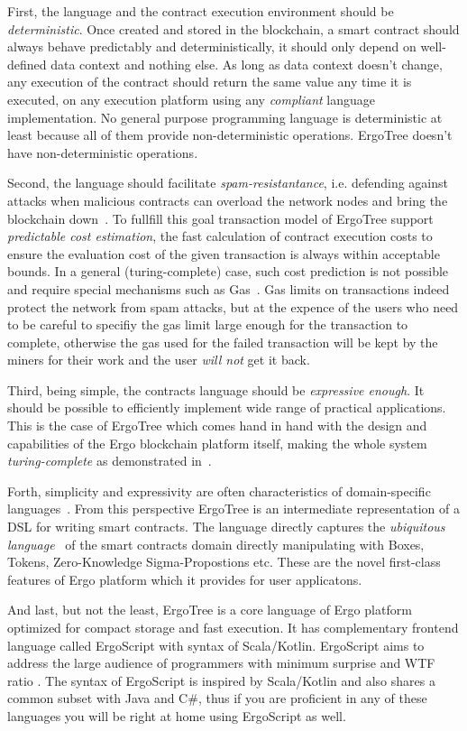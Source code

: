 \documentclass[11pt]{article}
\newcommand{\ASDag}{ErgoTree\xspace}
\begin{document}
First, the language and the contract execution environment should be
\emph{deterministic}. Once created and stored in the blockchain, a smart contract
should always behave predictably and deterministically, it should only depend on
well-defined data context and nothing else. As long as data context doesn't change, any
execution of the contract should return the same value any time it is executed, on any
execution platform using any \emph{compliant} language implementation. No general
purpose programming language is deterministic at least because all of them provide
non-deterministic operations. \ASDag doesn't have non-deterministic operations.

Second, the language should facilitate \emph{spam-resistantance}, i.e. defending
against attacks when malicious contracts can overload the network nodes and bring the
blockchain down~\cite{fivehrs}. To fullfill this goal transaction model of \ASDag support
\emph{predictable cost estimation}, the fast calculation of contract execution costs to
ensure the evaluation cost of the given transaction is always within acceptable bounds.
In a general (turing-complete) case, such cost prediction is not possible and require
special mechanisms such as Gas~\cite{wood2014ethereum}. Gas limits on transactions
indeed protect the network from spam attacks, but at the expence of the users who need to
be careful to specifiy the gas limit large enough for the transaction to complete,
otherwise the gas used for the failed transaction will be kept by the miners for their
work and the user \emph{will not} get it back.

Third, being simple, the contracts language should be \emph{expressive enough}. It
should be possible to efficiently implement wide range of practical applications. This
is the case of \ASDag which comes hand in hand with the design and capabilities of the
Ergo blockchain platform itself, making the whole system \emph{turing-complete} as 
demonstrated in~\cite{CKM18}.

Forth, simplicity and expressivity are often characteristics of domain-specific
languages~\cite{dslbook,HudakDSL}. From this perspective \ASDag is an intermediate
representation of a DSL for writing smart contracts. The language directly captures the
\emph{ubiquitous language}~\cite{UbiqLang} of the smart contracts domain directly
manipulating with Boxes, Tokens, Zero-Knowledge Sigma-Propostions etc.
These are the novel first-class features of Ergo platform which it provides for user
applicatons. 

And last, but not the least, \ASDag is a core language of Ergo platform optimized for
compact storage and fast execution. It has complementary frontend language called
ErgoScript with syntax of Scala/Kotlin. ErgoScript aims to address the large audience
of programmers with minimum surprise and WTF ratio \cite{WTFLang}. The syntax of
ErgoScript is inspired by Scala/Kotlin and also shares a common subset with Java and
C\#, thus if you are proficient in any of these languages you will be right at home
using ErgoScript as well.
\end{document}
